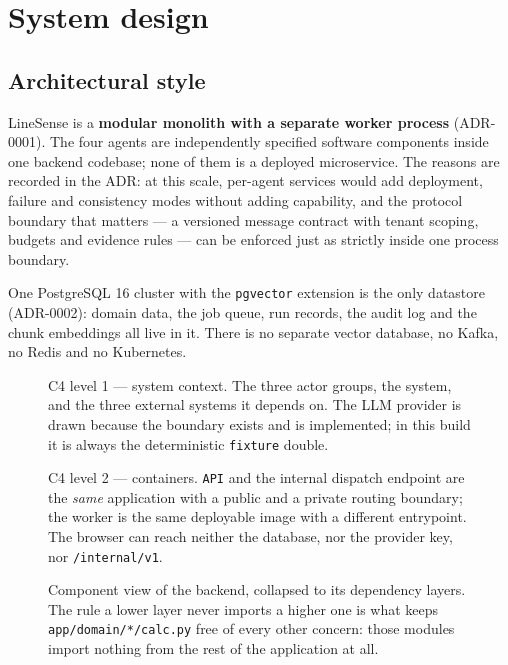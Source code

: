 \documentclass[11pt,a4paper]{article}
\begin{document}
\section{System design}

\subsection{Architectural style}

LineSense is a \textbf{modular monolith with a separate worker process}
(ADR-0001). The four agents are independently specified software components
inside one backend codebase; none of them is a deployed microservice. The
reasons are recorded in the ADR: at this scale, per-agent services would add
deployment, failure and consistency modes without adding capability, and the
protocol boundary that matters --- a versioned message contract with tenant
scoping, budgets and evidence rules --- can be enforced just as strictly inside
one process boundary.

One PostgreSQL 16 cluster with the \texttt{pgvector} extension is the only
datastore (ADR-0002): domain data, the job queue, run records, the audit log and
the chunk embeddings all live in it. There is no separate vector database, no
Kafka, no Redis and no Kubernetes.

\begin{figure}[p]
\centering
\resizebox{\textwidth}{!}{}
\caption{C4 level 1 --- system context. The three actor groups, the system, and
the three external systems it depends on. The LLM provider is drawn because the
boundary exists and is implemented; in this build it is always the deterministic
\texttt{fixture} double.}
\label{fig:context}
\end{figure}

\begin{figure}[p]
\centering
\resizebox{\textwidth}{!}{}
\caption{C4 level 2 --- containers. \texttt{API} and the internal dispatch
endpoint are the \emph{same} application with a public and a private routing
boundary; the worker is the same deployable image with a different entrypoint.
The browser can reach neither the database, nor the provider key, nor
\texttt{/internal/v1}.}
\label{fig:container}
\end{figure}

\begin{figure}[p]
\centering
\resizebox{\textwidth}{!}{}
\caption{Component view of the backend, collapsed to its dependency layers. The
rule a lower layer never imports a higher one is what keeps
\texttt{app/domain/*/calc.py} free of every other concern: those modules import
nothing from the rest of the application at all.}
\label{fig:components}
\end{figure}
\end{document}
